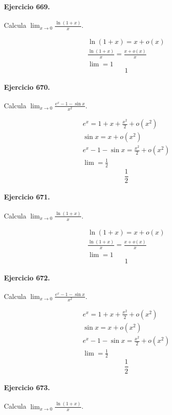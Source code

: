 \documentclass[11pt,a4paper]{article}
\begin{document}
\paragraph{Ejercicio 669.} Calcula $\displaystyle\lim_{x\to0}\frac{\ln(1+x)}{x}$.

\[
\begin{aligned}
\ln(1+x)=x+o(x)\\
\frac{\ln(1+x)}{x}=\frac{x+o(x)}{x}\\
\lim=1
\end{aligned}
\]
\[\boxed{1}\]


\paragraph{Ejercicio 670.} Calcula $\displaystyle\lim_{x\to0}\frac{e^x-1-\sin x}{x^2}$.

\[
\begin{aligned}
e^x=1+x+\frac{x^2}{2}+o(x^2)\\
\sin x=x+o(x^2)\\
e^x-1-\sin x=\frac{x^2}{2}+o(x^2)\\
\lim=\frac12
\end{aligned}
\]
\[\boxed{\frac12}\]


\paragraph{Ejercicio 671.} Calcula $\displaystyle\lim_{x\to0}\frac{\ln(1+x)}{x}$.

\[
\begin{aligned}
\ln(1+x)=x+o(x)\\
\frac{\ln(1+x)}{x}=\frac{x+o(x)}{x}\\
\lim=1
\end{aligned}
\]
\[\boxed{1}\]


\paragraph{Ejercicio 672.} Calcula $\displaystyle\lim_{x\to0}\frac{e^x-1-\sin x}{x^2}$.

\[
\begin{aligned}
e^x=1+x+\frac{x^2}{2}+o(x^2)\\
\sin x=x+o(x^2)\\
e^x-1-\sin x=\frac{x^2}{2}+o(x^2)\\
\lim=\frac12
\end{aligned}
\]
\[\boxed{\frac12}\]


\paragraph{Ejercicio 673.} Calcula $\displaystyle\lim_{x\to0}\frac{\ln(1+x)}{x}$.
\end{document}
